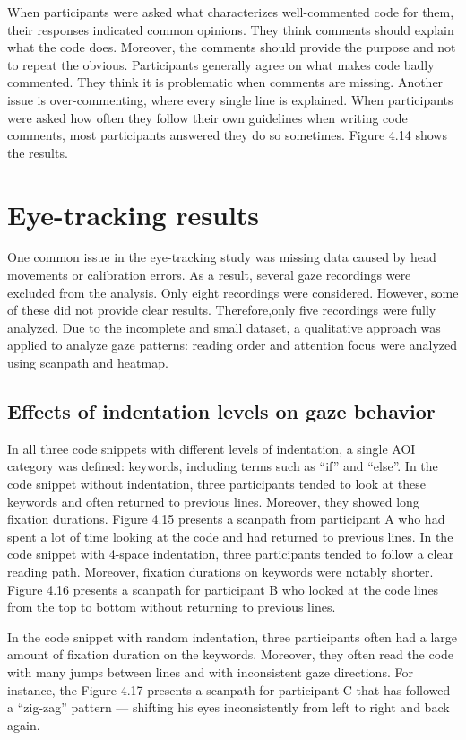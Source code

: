 When participants were asked what characterizes well-commented code for them, their responses indicated common opinions. They think comments should explain what the code does. Moreover, the comments should provide the purpose and not to repeat the obvious. Participants generally agree on what makes code badly commented. They think it is problematic when comments are missing. Another issue is over-commenting, where every single line is explained.
When participants were asked how often they follow their own guidelines when writing code comments, most participants answered they do so sometimes. Figure 4.14 shows the results.



\section{Eye-tracking results}
One common issue in the eye-tracking study was missing data caused by head movements or calibration errors. As a result, several gaze recordings were excluded from the analysis. Only eight recordings were considered. However, some of these did not provide clear results. Therefore,only five recordings were fully analyzed. 
Due to the incomplete and small dataset, a qualitative approach was applied to analyze gaze patterns: reading order and attention focus were analyzed using scanpath and heatmap.  
 


\subsection{Effects of indentation levels on gaze behavior}
In all three code snippets with different levels of indentation, a single AOI category was defined: keywords, including terms such as “if” and “else”. In the code snippet without indentation, three participants tended to look at these keywords and often returned to previous lines. Moreover, they showed long fixation durations.  Figure 4.15 presents a scanpath from participant A who had spent a lot of time looking at the code and had returned to previous lines. In the code snippet with 4-space indentation, three participants tended to follow a clear reading path. Moreover, fixation durations on keywords were notably shorter. Figure 4.16 presents a scanpath for participant B who looked at the code lines from the top to bottom without returning to previous lines.  


In the code snippet with random indentation, three participants often had a large amount of fixation duration on the keywords.  Moreover, they often read the code with many jumps between lines and with inconsistent gaze directions. For instance, the Figure 4.17 presents a scanpath for participant C that has followed a “zig-zag” pattern — shifting his eyes inconsistently from left to right and back again.  


